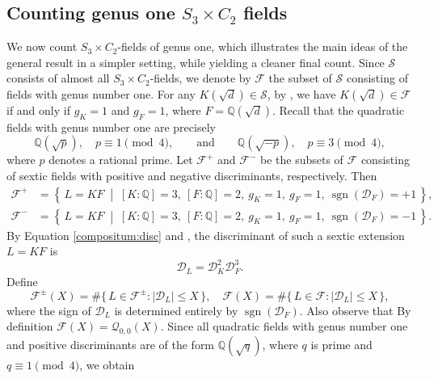 \documentclass[11pt,reqno]{amsart}
\newcommand{\Q}{\mathbb{Q}}
\newcommand{\cD}{\mathcal{D}}
\newcommand{\cF}{\mathcal{F}}
\newcommand{\cQ}{\mathcal{Q}}
\newcommand{\cS}{\mathcal{S}}
\theoremstyle{definition}
\theoremstyle{remark}
\begin{document}
\subsection{Counting genus one $S_3\times C_2$ fields}
We now count $S_3\times C_2$-fields of genus one, which illustrates the main ideas of the general result in a simpler setting, while yielding a cleaner final count. Since $\cS$ consists of almost all $S_3\times C_2$-fields, we denote by $\cF$ the subset of $\cS$ consisting of fields with genus number one. For any $K(\sqrt{d}) \in \cS$, by ,  
we have $K(\sqrt{d}) \in \cF$ if and only if $g_K = 1$ and $g_F = 1$, where $F = \Q(\sqrt{d})$.
Recall that the quadratic fields with genus number one are precisely 
\[
\Q\!\left(\sqrt{p}\right), \quad p \equiv 1 \pmod{4}, 
\qquad\text{and}\qquad 
\Q\!\left(\sqrt{-p}\right), \quad p \equiv 3 \pmod{4},
\]
where $p$ denotes a rational prime. Let $\cF^+$ and $\cF^-$ be the subsets of $\cF$ consisting of sextic fields with positive 
and negative discriminants, respectively. Then
\begin{align*}
    \cF^{+} &= \left\{\, L = KF \;\middle|\; [K:\Q]=3,\ [F:\Q]=2,\ g_K=1,\ g_F=1,\ \operatorname{sgn}(\cD_F)=+1 \,\right\}, \\
    \cF^{-} &= \left\{\, L = KF \;\middle|\; [K:\Q]=3,\ [F:\Q]=2,\ g_K=1,\ g_F=1,\ \operatorname{sgn}(\cD_F)=-1 \,\right\}.
\end{align*}
By Equation \eqref{compositum:disc} and , 
the discriminant of such a sextic extension $L = KF$ is
\[
\cD_L = \cD_K^2 \cD_F^3.
\]
Define
\[
\cF^{\pm}(X) = \#\{\, L \in \cF^{\pm} : |\cD_L| \leq X \,\}, \quad \cF(X) = \#\{\, L \in \cF : |\cD_L| \leq X \,\},   
\]
where the sign of $\cD_L$ is determined entirely by $\operatorname{sgn}(\cD_F)$.
Also observe that By definition $\cF(X) = \cQ_{0,0}(X)$.
Since all quadratic fields with genus number one and positive discriminants are of the form 
$\Q(\sqrt{q})$, where $q$ is prime and $q \equiv 1 \pmod{4}$, we obtain
\end{document}
